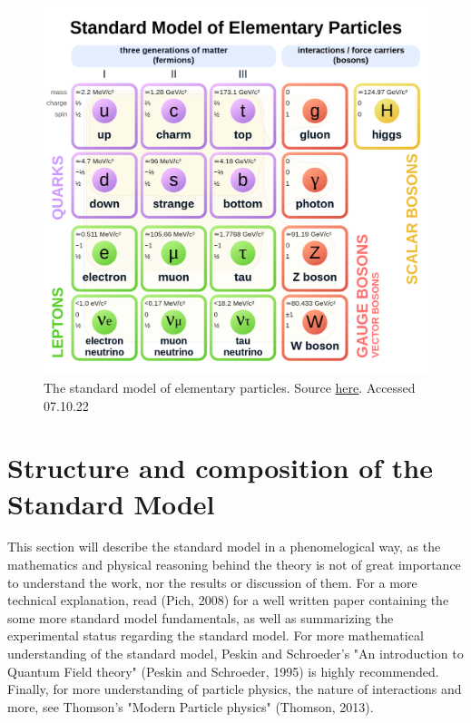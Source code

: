 
\begin{figure}[h!]
    \includegraphics[width=\linewidth]{Figures/SM/Standard_Model_of_Elementary_Particles.svg.png}
    \caption{The standard model of elementary particles. Source \href{https://upload.wikimedia.org/wikipedia/commons/thumb/0/00/Standard_Model_of_Elementary_Particles.svg/1200px-Standard_Model_of_Elementary_Particles.svg.png}{here}. Accessed 07.10.22}
    \label{fig:smdiagram}
\end{figure}

\section{Structure and composition of the Standard Model}
This section will describe the standard model in a phenomelogical way, as the mathematics and physical reasoning behind the theory is not of great 
importance to understand the work, nor the results or discussion of them. For a more technical explanation, read (Pich, 2008)\cite{Pich:819632} for a 
well written paper containing the some more standard model fundamentals, as well as summarizing the experimental status regarding the standard model.
For more mathematical understanding of the standard model, Peskin and Schroeder's "An introduction to Quantum Field theory" (Peskin and Schroeder, 1995)\cite{Peskin:1995ev}
 is highly recommended. Finally, for more understanding of particle physics, the nature of interactions and more, see Thomson's "Modern Particle physics" (Thomson, 2013)\cite{Thomson:2013zua}. \par


